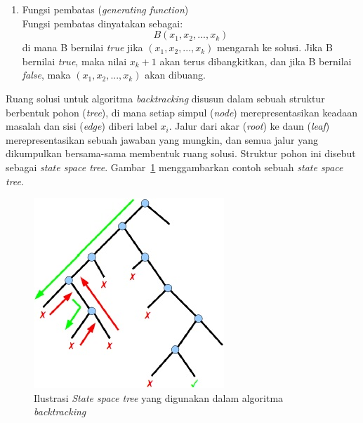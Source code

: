 \begin{enumerate}
\item Fungsi pembatas (\textit{generating function})
\\ Fungsi pembatas dinyatakan sebagai:
\begin{displaymath}
B(x_1, x_2, ..., x_k)
\end{displaymath}
di mana B bernilai \textit{true} jika \begin{math}(x_1, x_2, ..., x_k)\end{math} mengarah ke solusi. Jika B bernilai \textit{true}, maka nilai \begin{math}x_k+1\end{math} akan terus dibangkitkan, dan jika B bernilai \textit{false}, maka \begin{math}(x_1, x_2, ..., x_k)\end{math} akan dibuang.
\end{enumerate}

Ruang solusi untuk algoritma \textit{backtracking} disusun dalam sebuah struktur berbentuk pohon (\textit{tree}), di mana setiap simpul (\textit{node}) merepresentasikan keadaan masalah dan sisi (\textit{edge}) diberi label \begin{math}x_i\end{math}. Jalur dari akar (\textit{root}) ke daun (\textit{leaf}) merepresentasikan sebuah jawaban yang mungkin, dan semua jalur yang dikumpulkan bersama-sama membentuk ruang solusi. Struktur pohon ini disebut sebagai \textit{state space tree}. Gambar~\ref{fig:backtracking3} menggambarkan contoh sebuah \textit{state space tree}.

\begin{figure}
\centering
\captionsetup{justification=centering}
\includegraphics[scale=1]{Gambar/Backtracking3}
\caption[Ilustrasi \textit{State space tree} yang digunakan dalam algoritma  \textit{backtracking}  ~\cite{fahda:16:backtracking}]{Ilustrasi \textit{State space tree} yang digunakan dalam algoritma  \textit{backtracking} ~\cite{fahda:16:backtracking}}
\label{fig:backtracking3}
\end{figure}

